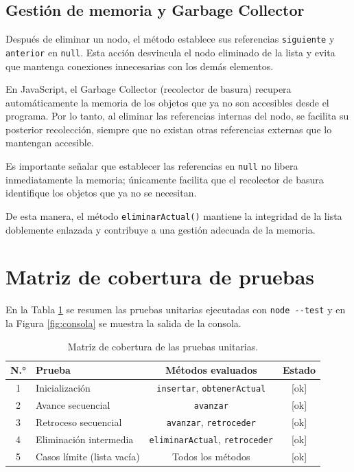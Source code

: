 \documentclass[11pt]{article}
\begin{document}
\subsection{Gestión de memoria y Garbage Collector}

Después de eliminar un nodo, el método establece sus referencias
\texttt{siguiente} y \texttt{anterior} en \texttt{null}. Esta acción
desvincula el nodo eliminado de la lista y evita que mantenga conexiones
innecesarias con los demás elementos.

En JavaScript, el Garbage Collector (recolector de basura) recupera
automáticamente la memoria de los objetos que ya no son accesibles
desde el programa. Por lo tanto, al eliminar las referencias internas
del nodo, se facilita su posterior recolección, siempre que no existan
otras referencias externas que lo mantengan accesible.

Es importante señalar que establecer las referencias en
\texttt{null} no libera inmediatamente la memoria; únicamente
facilita que el recolector de basura identifique los objetos que
ya no se necesitan.

De esta manera, el método \texttt{eliminarActual()} mantiene la
integridad de la lista doblemente enlazada y contribuye a una
gestión adecuada de la memoria.


\section{Matriz de cobertura de pruebas}

En la Tabla \ref{tab:cobertura} se resumen las pruebas unitarias ejecutadas con
\texttt{node -{}-test} y en la Figura \ref{fig:consola} se muestra la salida de la
consola.

\begin{table}[H]
    \centering\small
    \begin{tabular}{@{}clcc@{}}
    \toprule
        \textbf{N.°} & \textbf{Prueba} & \textbf{Métodos evaluados} & \textbf{Estado} \\
    \midrule
        1 & Inicialización        & \texttt{insertar}, \texttt{obtenerActual} & [ok] \\
        2 & Avance secuencial     & \texttt{avanzar}                          & [ok] \\
        3 & Retroceso secuencial  & \texttt{avanzar}, \texttt{retroceder}     & [ok] \\
        4 & Eliminación intermedia & \texttt{eliminarActual}, \texttt{retroceder} & [ok] \\
        5 & Casos límite (lista vacía) & Todos los métodos & [ok] \\
    \bottomrule
    \end{tabular}
    \caption{Matriz de cobertura de las pruebas unitarias.}
    \label{tab:cobertura}
\end{table}
\end{document}
